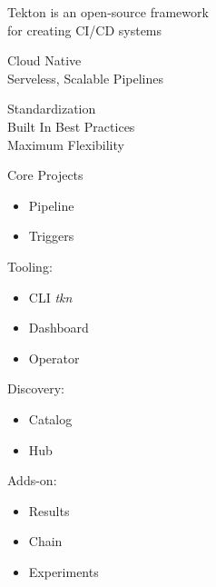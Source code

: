 \documentclass[aspectratio=169,11pt,hyperref={colorlinks=true}]{beamer}
\begin{document}
\begin{stripedframe}%
  {%
  Tekton is an open-source framework \\for creating CI/CD systems
  }%
  {%
  Cloud Native \\
  \vspace{0.03\textheight}
  Serveless, Scalable Pipelines \\
  \vspace{0.1\textheight}
  
  }%
  {%
  Standardization \\
  \vspace{0.03\textheight}
  Built In Best Practices \\
  \vspace{0.03\textheight}
  Maximum Flexibility \\
  }%
  {%
  Core Projects
  \begin{itemize}
    \item Pipeline
    \item Triggers
  \end{itemize}
  \vspace{0.01\textheight}
  Tooling:
  \begin{itemize}
    \item CLI \textit{tkn}
    \item Dashboard
    \item Operator
  \end{itemize}
  }%
  {%
  Discovery:
  \begin{itemize}
    \item Catalog
    \item Hub
  \end{itemize}
  \vspace{0.01\textheight}
  Adds-on:
  \begin{itemize}
    \item Results
    \item Chain
    \item Experiments
  \end{itemize}
  }%
\end{stripedframe}
\end{document}
